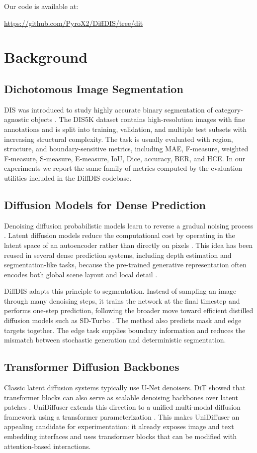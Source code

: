 \documentclass[sigconf,nonacm]{acmart}
\begin{document}
Our code is available at:
\begin{center}
\url{https://github.com/PyroX2/DiffDIS/tree/dit}
\end{center}

\section{Background}
\subsection{Dichotomous Image Segmentation}
DIS was introduced to study highly accurate binary segmentation of category-agnostic objects \cite{qin2022dis}. The DIS5K dataset contains high-resolution images with fine annotations and is split into training, validation, and multiple test subsets with increasing structural complexity. The task is usually evaluated with region, structure, and boundary-sensitive metrics, including MAE, F-measure, weighted F-measure, S-measure, E-measure, IoU, Dice, accuracy, BER, and HCE. In our experiments we report the same family of metrics computed by the evaluation utilities included in the DiffDIS codebase.

\subsection{Diffusion Models for Dense Prediction}
Denoising diffusion probabilistic models learn to reverse a gradual noising process \cite{ho2020ddpm}. Latent diffusion models reduce the computational cost by operating in the latent space of an autoencoder rather than directly on pixels \cite{rombach2022latent}. This idea has been reused in several dense prediction systems, including depth estimation and segmentation-like tasks, because the pre-trained generative representation often encodes both global scene layout and local detail \cite{ke2024marigold}.

DiffDIS adapts this principle to segmentation. Instead of sampling an image through many denoising steps, it trains the network at the final timestep and performs one-step prediction, following the broader move toward efficient distilled diffusion models such as SD-Turbo \cite{sauer2023sdturbo}. The method also predicts mask and edge targets together. The edge task supplies boundary information and reduces the mismatch between stochastic generation and deterministic segmentation.

\subsection{Transformer Diffusion Backbones}
Classic latent diffusion systems typically use U-Net denoisers. DiT showed that transformer blocks can also serve as scalable denoising backbones over latent patches \cite{peebles2023dit}. UniDiffuser extends this direction to a unified multi-modal diffusion framework using a transformer parameterization \cite{bao2023unidiffuser}. This makes UniDiffuser an appealing candidate for experimentation: it already exposes image and text embedding interfaces and uses transformer blocks that can be modified with attention-based interactions.
\end{document}

